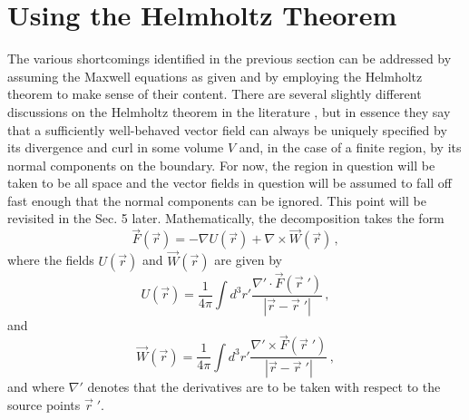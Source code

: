 \documentclass{article}
\begin{document}
\section{Using the Helmholtz Theorem}
The various shortcomings identified in the previous section can be addressed by assuming the Maxwell equations as given
and by employing the Helmholtz theorem to make sense of their content.  There are several slightly different 
discussions on the Helmholtz theorem in the literature \cite{Arfken,Miller,Mirman}, but in essence they say that a 
sufficiently well-behaved vector field can always be uniquely specified by its divergence and curl in some volume 
$V$ and, in the case of a finite region, by its normal components on the boundary.  For now, the region in question 
will be taken to be all space and the vector fields in question will be assumed to fall off fast enough that the normal 
components can be ignored. This point will be revisited in the Sec. 5 later.  Mathematically, the decomposition takes the 
form \cite{Miller}
\begin{equation}\label{Helm}
\vec F(\vec r) = - \nabla  U(\vec r) + \nabla \times \vec W(\vec r) \, ,
\end{equation}
where the fields $U(\vec r)$ and $\vec W(\vec r)$ are given by
\begin{equation}\label{scalar}
U(\vec r) = \frac{1}{4 \pi} \int d^3 r' \frac{\nabla' \cdot \vec F(\vec r \;') }{|\vec r - \vec r\;'|} \, ,
\end{equation}
and
\begin{equation}\label{vector}
\vec W (\vec r) = \frac{1}{4 \pi} \int d^3 r' \frac{\nabla' \times \vec F(\vec r\;')} {|\vec r - \vec r\;'|} \, ,
\end{equation}
and where $\nabla'$ denotes that the derivatives are to be taken with respect to the source points $\vec r\;'$.
\end{document}
